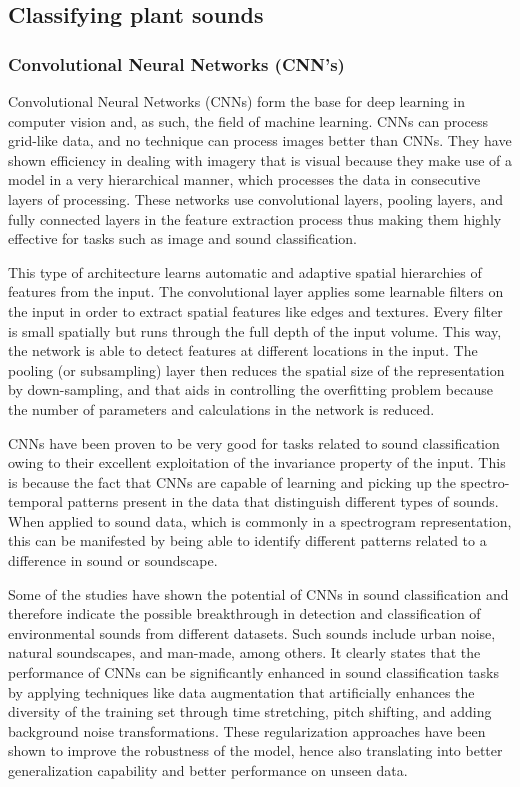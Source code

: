 \subsection{Classifying plant sounds}
\subsubsection{Convolutional Neural Networks (CNN's)}
Convolutional Neural Networks (CNNs) form the base for deep learning in computer vision and, as such, the field of machine learning. CNNs can process grid-like data, and no technique can process images better than CNNs. They have shown efficiency in dealing with imagery that is visual because they make use of a model in a very hierarchical manner, which processes the data in consecutive layers of processing. These networks use convolutional layers, pooling layers, and fully connected layers in the feature extraction process thus making them highly effective for tasks such as image and sound classification.\cite{oshea_introduction_2015}

This type of architecture learns automatic and adaptive spatial hierarchies of features from the input. The convolutional layer applies some learnable filters on the input in order to extract spatial features like edges and textures. Every filter is small spatially but runs through the full depth of the input volume. This way, the network is able to detect features at different locations in the input. The pooling (or subsampling) layer then reduces the spatial size of the representation by down-sampling, and that aids in controlling the overfitting problem because the number of parameters and calculations in the network is reduced. \cite{oshea_introduction_2015}

CNNs have been proven to be very good for tasks related to sound classification owing to their excellent exploitation of the invariance property of the input. This is because the fact that CNNs are capable of learning and picking up the spectro-temporal patterns present in the data that distinguish different types of sounds. When applied to sound data, which is commonly in a spectrogram representation, this can be manifested by being able to identify different patterns related to a difference in sound or soundscape. \cite{salamon_deep_2017, piczak_environmental_2015}

Some of the studies have shown the potential of CNNs in sound classification and therefore indicate the possible breakthrough in detection and classification of environmental sounds from different datasets. Such sounds include urban noise, natural soundscapes, and man-made, among others. It clearly states that the performance of CNNs can be significantly enhanced in sound classification tasks by applying techniques like data augmentation that artificially enhances the diversity of the training set through time stretching, pitch shifting, and adding background noise transformations. These regularization approaches have been shown to improve the robustness of the model, hence also translating into better generalization capability and better performance on unseen data. \cite{salamon_deep_2017, piczak_environmental_2015}

